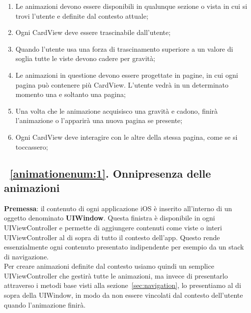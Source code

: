\begin{enumerate}
    \item\label{animationenum:1} Le animazioni devono essere disponibili in qualunque sezione o vista in cui si trovi l'utente e definite dal contesto attuale;

    \item\label{animationenum:2} Ogni CardView deve essere trascinabile dall'utente;
    
    \item\label{animationenum:3} Quando l'utente usa una forza di trascinamento superiore a un valore di soglia tutte le viste devono
        cadere per gravità;

    \item\label{animationenum:4} Le animazioni in questione devono essere progettate in pagine, in cui ogni pagina può contenere 
    più CardView. L'utente vedrà in un determinato momento una e soltanto una pagina;

    \item\label{animationenum:5} Una volta che le animazione acquisisco una gravità e cadono, finirà l'animazione o l'apparirà
    una nuova pagina se presente;

    \item\label{animationenum:6} Ogni CardView deve interagire con le altre della stessa pagina, come se si toccassero;

\end{enumerate}

\subsection{~\ref{animationenum:1}. Onnipresenza delle animazioni}

\textbf{Premessa}: il contenuto di ogni applicazione iOS è inserito all'interno di un oggetto denominato
    \textbf{UIWindow}\cite{uiwindow}. Questa finistra è disponibile in ogni UIViewController e permette di aggiungere contenuti
    come viste o interi UIViewController al di sopra di tutto il contesto dell'app. Questo rende essenzialmente ogni contenuto presentato
    indipendente per esempio da un stack di navigazione.\\ 

Per creare animazioni definite dal contesto usiamo quindi un semplice UIViewController che gestirà tutte le animazioni,
ma invece di presentarlo attraverso i metodi base visti alla sezione~\ref{sec:navigation}, lo presentiamo al di sopra della UIWindow,
in modo da non essere vincolati dal contesto dell'utente quando l'animazione finirà.

